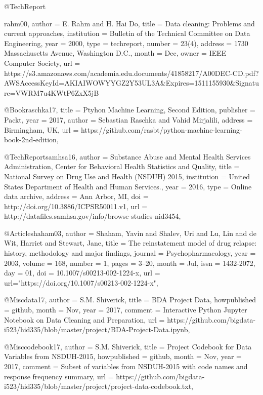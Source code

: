 @TechReport{rahm00,
  author      = {E. Rahm and H. Hai Do},
  title       = {Data cleaning: Problems and current approaches},
  institution = {Bulletin of the Technical Committee on Data Engineering},
  year        = {2000},
  type        = {techreport},
  number      = {23(4)},
  address     = {1730 Massachusetts Avenue, Washington D.C.},
  month       = Dec,
  owner       = {IEEE Computer Society},
  url         = {https://s3.amazonaws.com/academia.edu.documents/41858217/A00DEC-CD.pdf?AWSAccessKeyId=AKIAIWOWYYGZ2Y53UL3A&Expires=1511155930&Signature=VWRM7u4KWtP6ZxX5jB%
}

@Book{raschka17,
  title     = {Ptyhon Machine Learning, Second Edition},
  publisher = {Packt},
  year      = {2017},
  author    = {Sebastian Raschka and Vahid Mirjalili},
  address   = {Birmingham, UK},
  url       = {https://github.com/rasbt/python-machine-learning-book-2nd-edition},
}


@TechReport{samhsa16,
  author      = {Substance Abuse and Mental Health Services Administration, Center for Behavioral Health Statistics and Quality},
  title       = {National Survey on Drug Use and Health (NSDUH) 2015},
  institution = {United States Department of Health and Human Services.},
  year        = {2016},
  type        = {Online data archive},
  address     = {Ann Arbor, MI},
  doi         = {http://doi.org/10.3886/ICPSR50011.v1},
  url         = {http://datafiles.samhsa.gov/info/browse-studies-nid3454},
}


@Article{shaham03,
  author  = {Shaham, Yavin and Shalev, Uri and Lu, Lin and de Wit, Harriet and Stewart, Jane},
  title   = {The reinstatement model of drug relapse: history, methodology and major findings},
  journal = {Psychopharmacology},
  year    = {2003},
  volume  = {168},
  number  = {1},
  pages   = {3--20},
  month   = {Jul},
  issn    = {1432-2072},
  day     = {01},
  doi     = {10.1007/s00213-002-1224-x},
  url     = {url="https://doi.org/10.1007/s00213-002-1224-x"},
}


@Misc{data17,
  author       = {S.M. Shiverick},
  title        = {BDA Project Data},
  howpublished = {github},
  month        = Nov,
  year         = {2017},
  comment      = {Interactive Python Jupyter Notebook on Data Cleaning and Preparation},
  url          = {https://github.com/bigdata-i523/hid335/blob/master/project/BDA-Project-Data.ipynb},
}

@Misc{codebook17,
  author       = {S.M. Shiverick},
  title        = {Project Codebook for Data Variables from NSDUH-2015},
  howpublished = {github},
  month        = Nov,
  year         = {2017},
  comment      = {Subset of variables from NSDUH-2015 with code names and response frequency summary},
  url          = {https://github.com/bigdata-i523/hid335/blob/master/project/project-data-codebook.txt},
}

}
